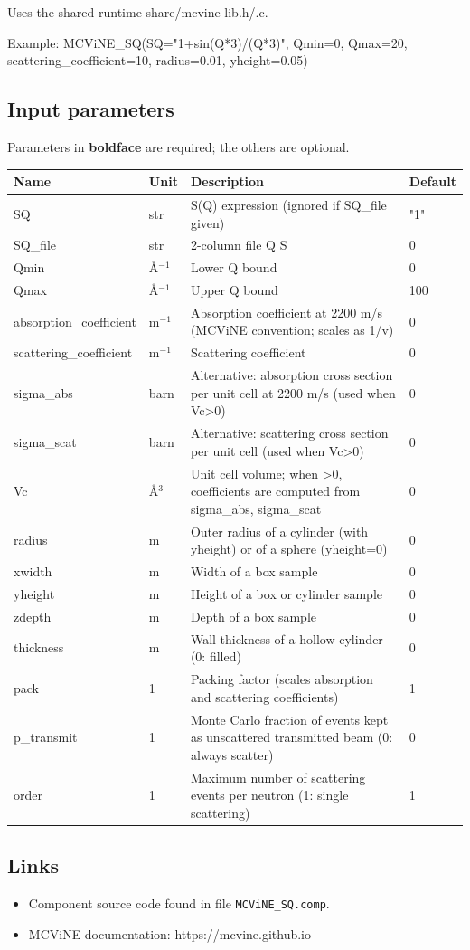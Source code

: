 Uses the shared runtime share/mcvine-lib.h/.c.

Example: MCViNE\_SQ(SQ="1+sin(Q*3)/(Q*3)", Qmin=0, Qmax=20, scattering\_coefficient=10, radius=0.01, yheight=0.05)

\subsection*{Input parameters}
Parameters in \textbf{boldface} are required; the others are optional.

\begin{longtable}{p{}p{}p{}p{}}
\toprule
\textbf{Name} & \textbf{Unit} & \textbf{Description} & \textbf{Default} \\
\midrule
\endhead
SQ & str & S(Q) expression (ignored if SQ\_file given) & "1" \\
SQ\_file & str & 2-column file Q S & 0 \\
Qmin & \AA{}$^{-1}$ & Lower Q bound & 0 \\
Qmax & \AA{}$^{-1}$ & Upper Q bound & 100 \\
absorption\_coefficient & m$^{-1}$ & Absorption coefficient at 2200 m/s (MCViNE convention; scales as 1/v) & 0 \\
scattering\_coefficient & m$^{-1}$ & Scattering coefficient & 0 \\
sigma\_abs & barn & Alternative: absorption cross section per unit cell at 2200 m/s (used when Vc\textgreater{}0) & 0 \\
sigma\_scat & barn & Alternative: scattering cross section per unit cell (used when Vc\textgreater{}0) & 0 \\
Vc & \AA{}$^{3}$ & Unit cell volume; when \textgreater{}0, coefficients are computed from sigma\_abs, sigma\_scat & 0 \\
radius & m & Outer radius of a cylinder (with yheight) or of a sphere (yheight=0) & 0 \\
xwidth & m & Width of a box sample & 0 \\
yheight & m & Height of a box or cylinder sample & 0 \\
zdepth & m & Depth of a box sample & 0 \\
thickness & m & Wall thickness of a hollow cylinder (0: filled) & 0 \\
pack & 1 & Packing factor (scales absorption and scattering coefficients) & 1 \\
p\_transmit & 1 & Monte Carlo fraction of events kept as unscattered transmitted beam (0: always scatter) & 0 \\
order & 1 & Maximum number of scattering events per neutron (1: single scattering) & 1 \\
\bottomrule
\end{longtable}

\subsection*{Links}
\begin{itemize}
  \item Component source code found in file \texttt{MCViNE\_SQ.comp}.
  \item MCViNE documentation: https://mcvine.github.io
\end{itemize}
